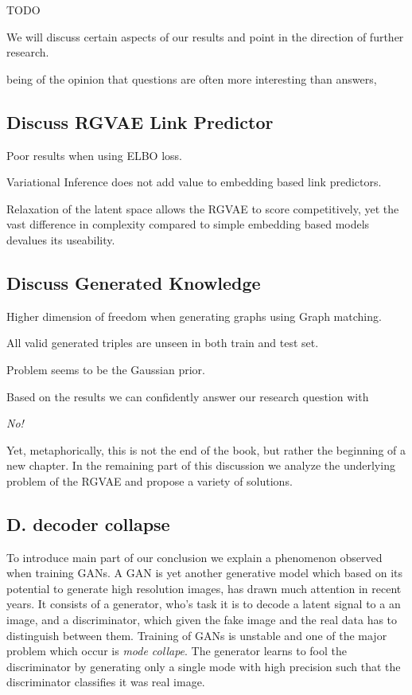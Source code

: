 
TODO

We will discuss certain aspects of our results and point in the direction of further research.

being of the opinion that questions are often more interesting than answers,

\subsection{Discuss RGVAE Link Predictor}


Poor results when using ELBO loss.

Variational Inference does not add value to embedding based link predictors.

Relaxation of the latent space allows the RGVAE to score competitively, yet the vast difference in complexity compared to simple embedding based models devalues its useability. 

\subsection{Discuss Generated Knowledge}

Higher dimension of freedom when generating graphs using Graph matching.

All valid generated triples are unseen in both train and test set. 

Problem seems to be the Gaussian prior.

Based on the results we can confidently answer our research question with 
\begin{center}
    \textit{No!}
\end{center}
Yet, metaphorically, this is not the end of the book, but rather the beginning of a new chapter. In the remaining part of this discussion we analyze the underlying problem of the RGVAE and propose a variety of solutions.


\subsection{D. decoder collapse}
\label{ssec7:collapse}

To introduce main part of our conclusion we explain a phenomenon observed when training GANs. A GAN is yet another generative model which based on its potential to generate high resolution images, has drawn much attention in recent years. It consists of a generator, who's task it is to decode a latent signal to a an image, and a discriminator, which given the fake image and the real data has to distinguish between them. Training of GANs is unstable and one of the major problem which occur is \textit{mode collape}. The generator learns to fool the discriminator by generating only a single mode with high precision such that the discriminator classifies it was real image.

